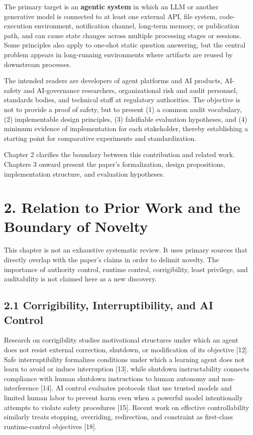 The primary target is an \textbf{agentic system} in which an LLM or another generative model is connected to at least one external API, file system, code-execution environment, notification channel, long-term memory, or publication path, and can cause state changes across multiple processing stages or sessions. Some principles also apply to one-shot static question answering, but the central problem appears in long-running environments where artifacts are reused by downstream processes.

The intended readers are developers of agent platforms and AI products, AI-safety and AI-governance researchers, organizational risk and audit personnel, standards bodies, and technical staff at regulatory authorities. The objective is not to provide a proof of safety, but to present (1) a common audit vocabulary, (2) implementable design principles, (3) falsifiable evaluation hypotheses, and (4) minimum evidence of implementation for each stakeholder, thereby establishing a starting point for comparative experiments and standardization.

Chapter 2 clarifies the boundary between this contribution and related work. Chapters 3 onward present the paper's formalization, design propositions, implementation structure, and evaluation hypotheses.

\section{2. Relation to Prior Work and the Boundary of Novelty}\label{relation-to-prior-work-and-the-boundary-of-novelty}

This chapter is not an exhaustive systematic review. It uses primary sources that directly overlap with the paper's claims in order to delimit novelty. The importance of authority control, runtime control, corrigibility, least privilege, and auditability is not claimed here as a new discovery.

\subsection{2.1 Corrigibility, Interruptibility, and AI Control}\label{corrigibility-interruptibility-and-ai-control}

Research on corrigibility studies motivational structures under which an agent does not resist external correction, shutdown, or modification of its objective {[}12{]}. Safe interruptibility formalizes conditions under which a learning agent does not learn to avoid or induce interruption {[}13{]}, while shutdown instructability connects compliance with human shutdown instructions to human autonomy and non-interference {[}14{]}. AI control evaluates protocols that use trusted models and limited human labor to prevent harm even when a powerful model intentionally attempts to violate safety procedures {[}15{]}. Recent work on effective controllability similarly treats stopping, overriding, redirection, and constraint as first-class runtime-control objectives {[}18{]}.

